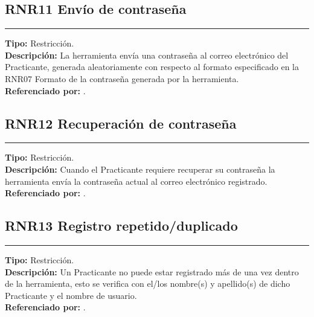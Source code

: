 \subsection{\normalsize{\textcolor[rgb]{0, 0, 0.545098}{RNR11 Envío de contraseña}}}
\label{rn:RNR11}
\rule[3mm]{16.59cm}{0.1mm} \vspace{1mm}
\textbf{Tipo:} Restricción.\\
\textbf{Descripción:} La herramienta envía una contraseña al correo electrónico del Practicante, generada aleatoriamente con respecto al formato especificado en la RNR07 Formato de la contraseña generada por la herramienta. \\
\textbf{Referenciado por: }  .\\

\subsection{\normalsize{\textcolor[rgb]{0, 0, 0.545098}{RNR12 Recuperación de contraseña}}}
\label{rn:RNR12}
\rule[3mm]{16.59cm}{0.1mm} \vspace{1mm}
\textbf{Tipo:} Restricción.\\
\textbf{Descripción:} Cuando el Practicante requiere recuperar su contraseña la herramienta envía la contraseña actual al correo electrónico registrado.\\
\textbf{Referenciado por: }  .\\

\subsection{\normalsize{\textcolor[rgb]{0, 0, 0.545098}{RNR13 Registro repetido/duplicado}}}
\label{rn:RNR13}
\rule[3mm]{16.59cm}{0.1mm} \vspace{1mm}
\textbf{Tipo:} Restricción.\\
\textbf{Descripción:} Un Practicante no puede estar registrado más de una vez dentro de la herramienta, esto se verifica con el/los nombre(s) y apellido(s) de dicho Practicante y el nombre de usuario.\\
\textbf{Referenciado por: }  .\\

